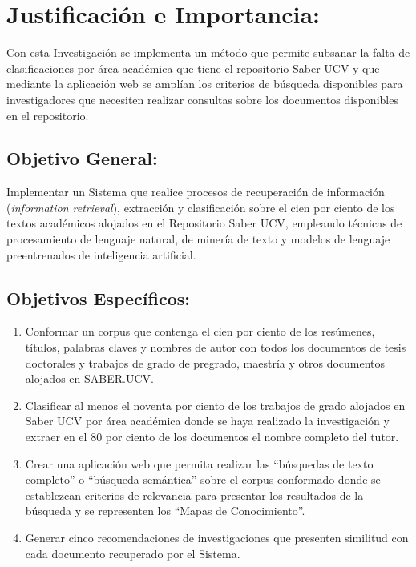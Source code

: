 \documentclass[
  12pt,
  openany]{book}
\begin{document}
\hypertarget{justificacion}{%
\section{Justificación e Importancia:}\label{justificacion}}

Con esta Investigación se implementa un método que permite subsanar la falta de clasificaciones por área académica que tiene el repositorio Saber UCV y que mediante la aplicación web se amplían los criterios de búsqueda disponibles para investigadores que necesiten realizar consultas sobre los documentos disponibles en el repositorio.

\hypertarget{objegeneral}{%
\subsection{Objetivo General:}\label{objegeneral}}

Implementar un Sistema que realice procesos de recuperación de información (\emph{information retrieval}), extracción y clasificación sobre el cien por ciento de los textos académicos alojados en el Repositorio Saber UCV, empleando técnicas de procesamiento de lenguaje natural, de minería de texto y modelos de lenguaje preentrenados de inteligencia artificial.

\hypertarget{objeespe}{%
\subsection{Objetivos Específicos:}\label{objeespe}}

\begin{enumerate}
\def\labelenumi{\arabic{enumi}.}
\item
  Conformar un corpus que contenga el cien por ciento de los resúmenes, títulos, palabras claves y nombres de autor con todos los documentos de tesis doctorales y trabajos de grado de pregrado, maestría y otros documentos alojados en SABER.UCV.
\item
  Clasificar al menos el noventa por ciento de los trabajos de grado alojados en Saber UCV por área académica donde se haya realizado la investigación y extraer en el 80 por ciento de los documentos el nombre completo del tutor.
\item
  Crear una aplicación web que permita realizar las ``búsquedas de texto completo'' o ``búsqueda semántica'' sobre el corpus conformado donde se establezcan criterios de relevancia para presentar los resultados de la búsqueda y se representen los ``Mapas de Conocimiento''.
\item
  Generar cinco recomendaciones de investigaciones que presenten similitud con cada documento recuperado por el Sistema.
\end{enumerate}
\end{document}
